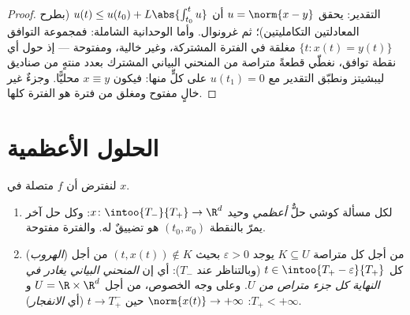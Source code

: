 \begin{proof}
التقدير: يحقق $u = \norm{x - y}$ أن $u(t) \leq u(t_0)
+ L\abs{\int_{t_0}^tu}$ (بطرح المعادلتين التكامليتين)؛
ثم غرونوال. وأما الوحدانية الشاملة: فمجموعة التوافق $\{t : x(t)
= y(t)\}$
مغلقة في الفترة المشتركة، وغير خالية، ومفتوحة --- إذ حول أي نقطة
توافق، نغطّي قطعةً متراصة من المنحني البياني المشترك بعدد منتهٍ
من صناديق ليبشيتز ونطبّق التقدير مع $u(t_1) = 0$ على كلٍّ منها:
فيكون $x \equiv y$ محليًّا. وجزءٌ غير خالٍ مفتوح ومغلق من فترة
هو الفترة كلها.
\end{proof}

\section{الحلول الأعظمية}

\begin{theorem}
\label{thm:b3:ode:maximal}
لنفترض أن $f$ متصلة  في $x$.
\begin{enumerate}
  \item لكل مسألة كوشي حلٌّ \emph{أعظمي} وحيد $x \colon \intoo{T_-}{T_+} \to \R^d$: وكل حل
        آخر يمرّ بالنقطة $(t_0, x_0)$ هو تضييقٌ له. والفترة
        مفتوحة.
  \item (\emph{الهروب}) من أجل كل متراصة $K \subseteq U$ يوجد
        $\varepsilon > 0$ بحيث $(t, x(t)) \notin
        K$ من أجل كل $t \in \intoo{T_+ - \varepsilon}{T_+}$ (وبالتناظر عند
        $T_-$): أي إن \emph{المنحني البياني  يغادر
        في النهاية كل جزء متراص من $U$}. وعلى وجه الخصوص، من
        أجل $U = \R\times\R^d$ و $T_+ < +\infty$: $\norm{x(t)} \to +\infty$ حين
        $t \to T_+^-$ (أي \emph{الانفجار}).
\end{enumerate}
\end{theorem}

